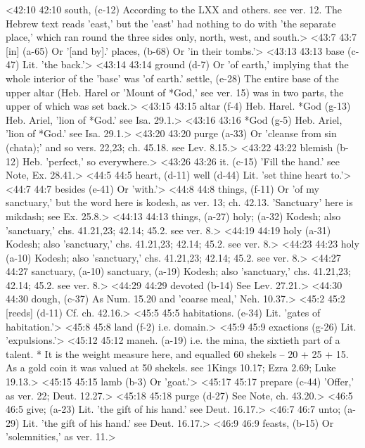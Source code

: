 <42:10 42:10  south, (c-12)  According to the LXX and others. see ver. 12. The Hebrew text  reads 'east,' but the 'east' had nothing to do with 'the  separate place,' which ran round the three sides only, north,  west, and south.>
<43:7 43:7  [in] (a-65)  Or '[and by].'
  places, (b-68)  Or 'in their tombs.'>
<43:13 43:13  base (c-47)  Lit. 'the back.'>
<43:14 43:14  ground (d-7)  Or 'of earth,' implying that the whole interior of the 'base'  was 'of earth.'
  settle, (e-28)  The entire base of the upper altar (Heb. Harel or 'Mount of  *God,' see ver. 15) was in two parts, the upper of which was  set back.>
<43:15 43:15  altar (f-4)  Heb. Harel.
  *God (g-13)  Heb. Ariel, 'lion of *God.' see Isa. 29.1.>
<43:16 43:16  *God (g-5)  Heb. Ariel, 'lion of *God.' see Isa. 29.1.>
<43:20 43:20  purge (a-33)  Or 'cleanse from sin (chata);' and so vers. 22,23; ch. 45.18. see Lev. 8.15.>
<43:22 43:22  blemish (b-12)  Heb. 'perfect,' so everywhere.>
<43:26 43:26  it. (c-15)  'Fill the hand.' see Note, Ex. 28.41.>
<44:5 44:5  heart, (d-11)  well (d-44)
  Lit. 'set thine heart to.'>
<44:7 44:7  besides (e-41)  Or 'with.'>
<44:8 44:8  things, (f-11)  Or 'of my sanctuary,' but the word here is kodesh, as ver.  13; ch. 42.13. 'Sanctuary' here is mikdash; see Ex. 25.8.>
<44:13 44:13  things, (a-27)  holy; (a-32)
  Kodesh; also 'sanctuary,' chs. 41.21,23; 42.14; 45.2. see  ver. 8.>
<44:19 44:19  holy (a-31)  Kodesh; also 'sanctuary,' chs. 41.21,23; 42.14; 45.2. see  ver. 8.>
<44:23 44:23  holy (a-10)  Kodesh; also 'sanctuary,' chs. 41.21,23; 42.14; 45.2. see  ver. 8.>
<44:27 44:27  sanctuary, (a-10)  sanctuary, (a-19)
  Kodesh; also 'sanctuary,' chs. 41.21,23; 42.14; 45.2. see  ver. 8.>
<44:29 44:29  devoted (b-14)  See Lev. 27.21.>
<44:30 44:30  dough, (c-37)  As Num. 15.20 and 'coarse meal,' Neh. 10.37.>
<45:2 45:2  [reeds] (d-11)  Cf. ch. 42.16.>
<45:5 45:5  habitations. (e-34)  Lit. 'gates of habitation.'>
<45:8 45:8  land (f-2)  i.e. domain.>
<45:9 45:9  exactions (g-26)  Lit. 'expulsions.'>
<45:12 45:12  maneh. (a-19)  i.e. the mina, the sixtieth part of a talent. * It is the  weight measure here, and equalled 60 shekels -- 20 + 25 + 15.  As a gold coin it was valued at 50 shekels. see 1Kings 10.17;  Ezra 2.69; Luke 19.13.>
<45:15 45:15  lamb (b-3)  Or 'goat.'>
<45:17 45:17  prepare (c-44)  'Offer,' as ver. 22; Deut. 12.27.>
<45:18 45:18  purge (d-27)  See Note, ch. 43.20.>
<46:5 46:5  give; (a-23) Lit. 'the gift of his hand.' see Deut. 16.17.>
<46:7 46:7  unto; (a-29) Lit. 'the gift of his hand.' see Deut. 16.17.>
<46:9 46:9  feasts, (b-15)  Or 'solemnities,' as ver. 11.>
